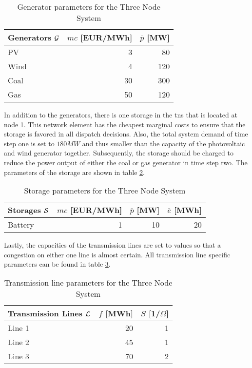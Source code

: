 \begin{table}[h!]
    \centering
    \begin{tabular}{lrr}
        Generators $\mathcal{G}$ & $mc$ [EUR/MWh] & $\overline{p}$ [MW] \\ \toprule
        PV & 3 & 80 \\
        Wind & 4 & 120 \\
        Coal & 30 & 300 \\
        Gas & 50 & 120 \\
        \bottomrule
    \end{tabular}
    \caption{Generator parameters for the Three Node System} \label{tab:res:param-gen}
\end{table}

In addition to the generators, there is one storage in the \gls{tns} that is located at node 1. This network element has the cheapest marginal costs to ensure that the storage is favored in all dispatch decisions. Also, the total system demand of time step one is set to $180 MW$ and thus smaller than the capacity of the photovoltaic and wind generator together. Subsequently, the storage should be charged to reduce the power output of either the coal or gas generator in time step two. The parameters of the storage are shown in table \ref{tab:res:param-stor}.


 \begin{table}[h!]
    \centering
    \begin{tabular}{lrrr}
        Storages $\mathcal{S}$ & $mc$ [EUR/MWh] & $\overline{p}$ [MW] & $\overline{e}$ [MWh] \\ \toprule
        Battery & 1 & 10 & 20 \\
        \bottomrule
    \end{tabular}
    \caption{Storage parameters for the Three Node System} \label{tab:res:param-stor}
\end{table}

Lastly, the capacities of the transmission lines are set to values so that a congestion on either one line is almost certain. All transmission line specific parameters can be found in table \ref{tab:res:param-line}.

 \begin{table}[h!]
    \centering
    \begin{tabular}{lrr}
        Transmission Lines $\mathcal{L}$ & $f$ [MWh] & $S$ [1/$\Omega$] \\ \toprule
        Line 1 & 20 & 1 \\
        Line 2 & 45 & 1 \\
        Line 3 & 70 & 2 \\
        \bottomrule
    \end{tabular}
    \caption{Transmission line parameters for the Three Node System}
    \label{tab:res:param-line}
\end{table}

